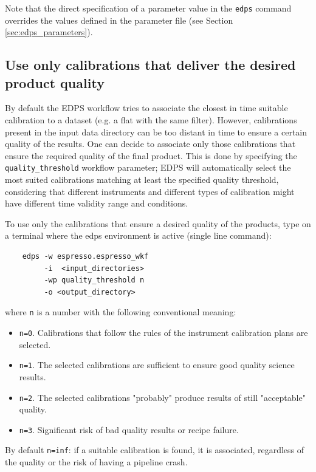 Note that the direct specification of a parameter value in the {\tt edps} command overrides the values defined in the parameter file (see Section \ref{sec:edps_parameters}). 

\subsection{Use only calibrations that deliver the desired product quality}
\label{sec:edps_quality}

By default the EDPS workflow tries to associate the closest in time suitable calibration to a dataset (e.g. a flat with the same filter). However, calibrations present in the input data directory can be too distant in time to ensure a certain quality of the results.
One can decide to associate only those calibrations that ensure the required quality of the final product. This is done by specifying the {\tt quality\_threshold} workflow parameter; EDPS will automatically select the most suited calibrations matching at least the specified quality threshold, considering that different instruments and different types of calibration might have different time validity range and conditions. 

To use only the calibrations that ensure a desired quality of the products, type on a terminal where the edps environment is active (single line command):

\begin{verbatim}
    edps -w espresso.espresso_wkf
         -i  <input_directories> 
         -wp quality_threshold n 
         -o <output_directory>
\end{verbatim}


where {\tt n} is a number with the following conventional meaning:
\begin{itemize}
    \item {\tt n=0}. Calibrations that follow the rules of the instrument calibration plans are selected.
    \item {\tt n=1}. The selected calibrations are sufficient to ensure good quality science results.
    \item {\tt n=2}. The selected calibrations "probably" produce results of still "acceptable" quality.
    \item {\tt n=3}. Significant risk of bad quality results or recipe failure.
\end{itemize}

By default {\tt n=inf}: if a suitable calibration is found, it is associated, regardless of the quality or the risk of having a pipeline crash.

